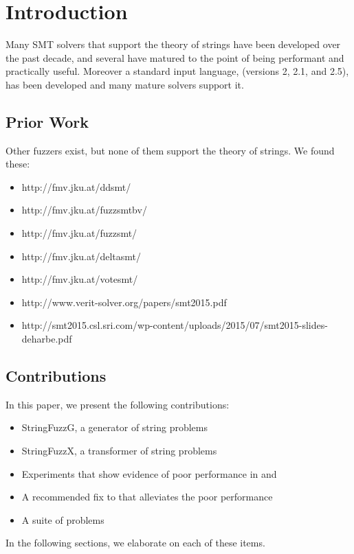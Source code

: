 \section{Introduction}

    Many SMT solvers that support the theory of strings have been developed over the past decade, and several have matured to the point of being performant and practically useful. Moreover a standard input language, \smt{} (versions 2, 2.1, and 2.5), has been developed and many mature solvers support it.

    \subsection{Prior Work}

        Other fuzzers exist, but none of them support the theory of strings. We found these:

        \begin{itemize}
            \item http://fmv.jku.at/ddsmt/
            \item http://fmv.jku.at/fuzzsmtbv/
            \item http://fmv.jku.at/fuzzsmt/
            \item http://fmv.jku.at/deltasmt/
            \item http://fmv.jku.at/votesmt/
            \item http://www.verit-solver.org/papers/smt2015.pdf
            \item http://smt2015.csl.sri.com/wp-content/uploads/2015/07/smt2015-slides-deharbe.pdf
        \end{itemize}

    \subsection{Contributions}

        In this paper, we present the following contributions:

        \begin{itemize}
            \item StringFuzzG, a generator of \smt{} string problems
            \item StringFuzzX, a transformer of \smt{} string problems
            \item Experiments that show evidence of poor performance in \us{} and \cvc{}
            \item A recommended fix to \us{} that alleviates the poor performance
            \item A suite of \smt{} problems
        \end{itemize}

        In the following sections, we elaborate on each of these items.
